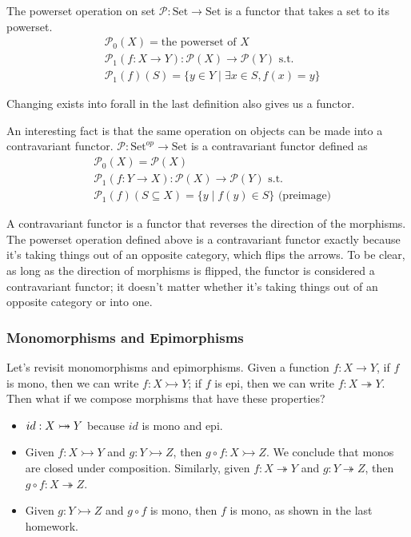 \documentclass[12pt]{article}
\theoremstyle{plain}
\theoremstyle{definition}
\theoremstyle{remark}
\newcommand{\pow}{\mathscr P}
\newcommand{\twoheadrightarrowtail}{\mathrel{\ooalign{\hfil$\rightarrowtail$\hfil\cr\hfil$\twoheadrightarrow$\hfil}}}
\newcommand{\Set}{\mathrm{Set}}
\begin{document}
The powerset operation on set $\pow: \Set \to \Set$ is a functor that takes a set to its powerset.
\begin{align*}
  &\pow_0(X) = \text{the powerset of } X \\
  &\pow_1(f : X \to Y) : \pow(X) \to \pow(Y) \text{ s.t. } \\
  &\pow_1(f)(S) = \{ y \in Y \mid \exists x \in S, f(x) = y \}
\end{align*}

Changing exists into forall in the last definition also gives us a functor.

An interesting fact is that the same operation on objects can be made into a contravariant functor.
$\pow: \Set^{op} \to \Set$ is a contravariant functor defined as
\begin{align*}
  &\pow_0(X) = \pow(X) \\
  &\pow_1(f : Y \to X) : \pow(X) \to \pow(Y) \text{ s.t. } \\
  &\pow_1(f)(S \subseteq X) = \{ y \mid f(y) \in S \} \text{ (preimage)}
\end{align*}

A contravariant functor is a functor that reverses the direction of the morphisms. The powerset operation defined above is a contravariant functor exactly because it's taking things out of an opposite category, which flips the arrows. To be clear, as long as the direction of morphisms is flipped, the functor is considered a contravariant functor; it doesn't matter whether it's taking things out of an opposite category or into one.


\subsubsection*{Monomorphisms and Epimorphisms}

Let's revisit monomorphisms and epimorphisms. Given a function $f: X \to Y$, if $f$ is mono, then we can write $f: X \rightarrowtail Y$; if $f$ is epi, then we can write $f: X \twoheadrightarrow Y$. Then what if we compose morphisms that have these properties?
\begin{itemize}
  \item $id: X \twoheadrightarrowtail Y$ because $id$ is mono and epi.
  \item Given $f: X \rightarrowtail Y$ and $g: Y \rightarrowtail Z$, then $g \circ f: X \rightarrowtail Z$. We conclude that monos are closed under composition. Similarly, given $f: X \twoheadrightarrow Y$ and $g: Y \twoheadrightarrow Z$, then $g \circ f: X \twoheadrightarrow Z$.
  \item Given $g: Y \rightarrowtail Z$ and $g \circ f$ is mono, then $f$ is mono, as shown in the last homework.
\end{itemize}
\end{document}

